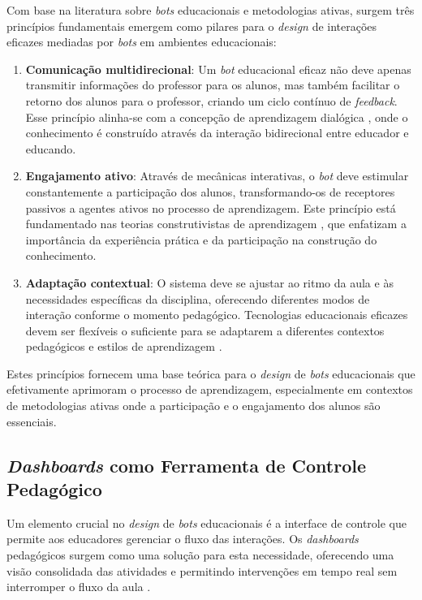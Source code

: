Com base na literatura sobre \textit{bots} educacionais e metodologias ativas,
surgem três princípios fundamentais emergem como pilares para o \textit{design}
de interações eficazes mediadas por \textit{bots} em ambientes educacionais:

\begin{enumerate}
\item \textbf{Comunicação multidirecional}: Um \textit{bot} educacional eficaz
não deve apenas transmitir informações do professor para os alunos, mas também
facilitar o retorno dos alunos para o professor, criando um ciclo contínuo de
\textit{feedback}.  Esse princípio alinha-se com a concepção de aprendizagem
dialógica
\cite{calvo2013}, onde o conhecimento é construído através da interação
bidirecional entre educador e educando.
\item \textbf{Engajamento ativo}: Através de mecânicas interativas, o
\textit{bot} deve estimular constantemente a participação dos alunos,
transformando-os de receptores passivos a agentes ativos no processo de
aprendizagem. Este princípio está fundamentado nas teorias construtivistas de
aprendizagem \cite{piaget1970}, que enfatizam a importância da experiência
prática e da participação na construção do conhecimento.
\item \textbf{Adaptação contextual}: O sistema deve se ajustar ao ritmo da aula
e às necessidades específicas da disciplina, oferecendo diferentes modos de
interação conforme o momento pedagógico. Tecnologias educacionais eficazes devem
ser flexíveis o suficiente para se adaptarem a diferentes contextos pedagógicos
e estilos de aprendizagem \cite{winkler2018}.
\end{enumerate}

Estes princípios fornecem uma base teórica para o \textit{design} de
\textit{bots} educacionais que efetivamente aprimoram o processo de
aprendizagem, especialmente em contextos de metodologias ativas onde a
participação e o engajamento dos alunos são essenciais.

\subsection{\textit{Dashboards} como Ferramenta de Controle Pedagógico}
\label{subsec:dashboards}

Um elemento crucial no \textit{design} de \textit{bots} educacionais é a
interface de controle que permite aos educadores gerenciar o fluxo das
interações. Os \textit{dashboards} pedagógicos surgem como uma solução para esta
necessidade, oferecendo uma visão consolidada das atividades e permitindo
intervenções em tempo real sem interromper o fluxo da aula \cite{verbert2013}.

